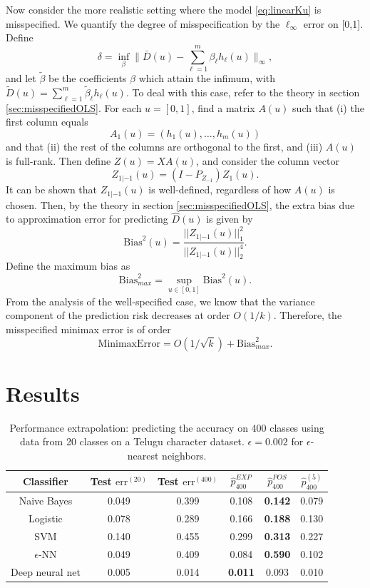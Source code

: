 \documentclass[12pt]{article}
\begin{document}
Now consider the more realistic setting where the
model \eqref{eq:linearKu} is misspecified.  We quantify the degree of
misspecification by the $\ell_\infty$ error on [0,1].  Define
\[
\delta = \inf_{\beta} \|\bar{D}(u) - \sum_{\ell = 1}^m \beta_\ell h_\ell(u)\|_\infty,
\]
and let $\tilde{\beta}$ be the coefficients $\beta$ which attain the infimum,
with $\tilde{D}(u) = \sum_{\ell = 1}^m \tilde{\beta}_\ell h_\ell(u)$.
To deal with this case, refer to the theory in section \ref{sec:misspecifiedOLS}.
For each $u = [0,1]$, find a matrix $A(u)$ such that (i) the first column equals
\[
A_1(u) = (h_1(u),\hdots, h_m(u))
\]
and that (ii) the rest of the columns are orthogonal to the first,
and (iii) $A(u)$ is full-rank.
Then define $Z(u) = X A(u)$,
and consider the column vector
\[
Z_{1|-1}(u) = (I - P_{Z_{-1}}) Z_1(u).
\]
It can be shown that $Z_{1|-1}(u)$ is well-defined, regardless of how
$A(u)$ is chosen.  Then, by the theory in section \ref{sec:misspecifiedOLS},
the extra bias due to approximation error for predicting $\hat{D}(u)$
is given by
\[
\text{Bias}^2(u) = \frac{||Z_{1|-1}(u)||_1^2}{||Z_{1|-1}(u)||_2^4}.
\]
Define the maximum bias as
\[
\text{Bias}^2_{max} = \sup_{ u \in [0,1]} \text{Bias}^2(u).
\]
From the analysis of the well-specified case, we know that the
variance component of the prediction risk decreases at order $O(1/k)$.
Therefore, the misspecified minimax error is of order
\[
\text{MinimaxError} = O(1/\sqrt{k}) + \text{Bias}^2_{max}.
\]



\section{Results}

\begin{table}
\centering
\begin{tabular}{|c||c|c|c|c|c|}\hline
Classifier      & Test $\text{err}^{(20)}$ & Test $\text{err}^{(400)}$ & $\hat{p}^{EXP}_{400}$ & $\hat{p}^{POS}_{400}$ & $\hat{p}^{(5)}_{400}$\\ \hline
Naive Bayes     & 0.049                   & 0.399                   & 0.108              & \textbf{0.142}      & 0.079             \\ \hline
Logistic        & 0.078                   & 0.289                   & 0.166              & \textbf{0.188}      & 0.130             \\ \hline
SVM             & 0.140                   & 0.455                   & 0.299              & \textbf{0.313}      & 0.227             \\ \hline
$\epsilon$-NN   & 0.049                   & 0.409                   & 0.084              & \textbf{0.590}      & 0.102             \\ \hline
Deep neural net & 0.005                   & 0.014                   & \textbf{0.011}     & 0.093               & 0.010             \\ \hline
\end{tabular}
\caption{Performance extrapolation: predicting the accuracy on 400 classes using data from 20 classes on a Telugu character dataset.
$\epsilon = 0.002$ for $\epsilon$-nearest neighbors.}
\end{table}
\end{document}
